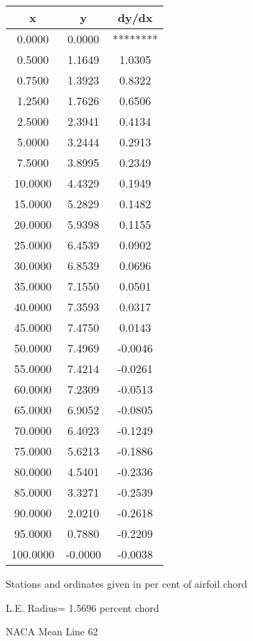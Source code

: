 \documentclass[11pt]{book}
\begin{document}
 \vspace{8mm}
 \begin{tabular}{|c|c|c|} \hline 
  x  &  y  &  dy/dx \\
 \hline
0.0000 & 0.0000 & ******** \\
0.5000 & 1.1649 & 1.0305 \\
0.7500 & 1.3923 & 0.8322 \\
1.2500 & 1.7626 & 0.6506 \\
2.5000 & 2.3941 & 0.4134 \\
5.0000 & 3.2444 & 0.2913 \\
7.5000 & 3.8995 & 0.2349 \\
10.0000 & 4.4329 & 0.1949 \\
15.0000 & 5.2829 & 0.1482 \\
20.0000 & 5.9398 & 0.1155 \\
25.0000 & 6.4539 & 0.0902 \\
30.0000 & 6.8539 & 0.0696 \\
35.0000 & 7.1550 & 0.0501 \\
40.0000 & 7.3593 & 0.0317 \\
45.0000 & 7.4750 & 0.0143 \\
50.0000 & 7.4969 & -0.0046 \\
55.0000 & 7.4214 & -0.0261 \\
60.0000 & 7.2309 & -0.0513 \\
65.0000 & 6.9052 & -0.0805 \\
70.0000 & 6.4023 & -0.1249 \\
75.0000 & 5.6213 & -0.1886 \\
80.0000 & 4.5401 & -0.2336 \\
85.0000 & 3.3271 & -0.2539 \\
90.0000 & 2.0210 & -0.2618 \\
95.0000 & 0.7880 & -0.2209 \\
100.0000 & -0.0000 & -0.0038 \\
 \hline
 \end{tabular}
 \vspace{8mm}


Stations and ordinates given in per cent of airfoil chord 


L.E. Radius=  1.5696 percent chord
 \newpage
 \label{ml62}
 \begin{Large}
 NACA Mean Line 62
 \end{Large}
  
\end{document}
